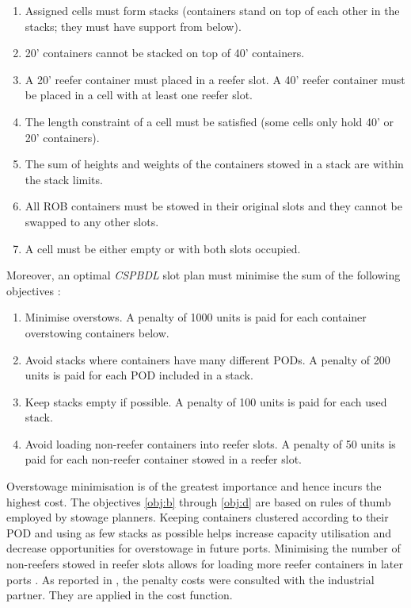 \documentclass[preprint,12pt,3p]{elsarticle}
\begin{document}
\begin{enumerate}[label=(\roman*), noitemsep]
    \item \label{constr:a} Assigned cells must form stacks (containers stand on top of each other in the stacks; they must have support from below).
    \item \label{constr:b} 20' containers cannot be stacked on top of 40' containers.
    \item \label{constr:c} A 20' reefer container must placed in a reefer slot. A 40' reefer container must be placed in a cell with at least one reefer slot.
    \item \label{constr:d} The length constraint of a cell must be satisfied (some cells only hold 40' or 20' containers).
    \item \label{constr:e} The sum of heights and weights of the containers stowed in a stack are within the stack limits.
    \item \label{constr:f} All ROB containers must be stowed in their original slots and they cannot be swapped to any other slots.
    \item \label{constr:g} A cell must be either empty or with both slots occupied.
\end{enumerate}

Moreover, an optimal \textit{CSPBDL} slot plan must minimise the sum of the following objectives \cite{DJJRA12}:

\begin{enumerate}[label=(\alph*), noitemsep]
    \item \label{obj:a} Minimise overstows. A penalty of 1000 units is paid for each container overstowing containers below.
    \item \label{obj:b} Avoid stacks where containers have many different PODs. A penalty of 200 units is paid for each POD included in a stack.
    \item \label{obj:c} Keep stacks empty if possible. A penalty of 100 units is paid for each used stack.
    \item \label{obj:d} Avoid loading non-reefer containers into reefer slots. A penalty of 50 units is paid for each non-reefer container stowed in a reefer slot.
\end{enumerate}

Overstowage minimisation is of the greatest importance and hence incurs the highest cost. The objectives \ref{obj:b} through \ref{obj:d} are based on rules of thumb employed by stowage planners. Keeping containers clustered according to their POD and using as few stacks as possible helps increase capacity utilisation and decrease opportunities for overstowage in future ports. Minimising the number of non-reefers stowed in reefer slots allows for loading more reefer containers in later ports \cite{DJJRA12}. As reported in \cite{DJJRA12}, the penalty costs were consulted with the industrial partner. They are applied in the cost function.
\end{document}
